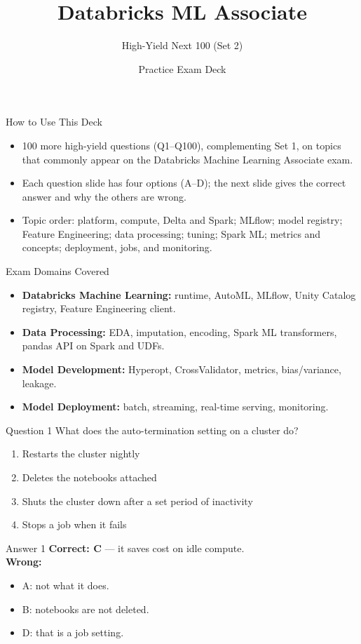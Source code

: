 \documentclass[aspectratio=169,11pt]{beamer}
\title{Databricks ML Associate}
\subtitle{High-Yield Next 100 (Set 2)}
\author{Practice Exam Deck}
\date{}
\begin{document}
\begin{frame}
\titlepage
\end{frame}

\begin{frame}{How to Use This Deck}
\begin{itemize}
\item 100 more high-yield questions (Q1--Q100), complementing Set 1, on topics that commonly appear on the Databricks Machine Learning Associate exam.
\item Each question slide has four options (A--D); the next slide gives the correct answer and why the others are wrong.
\item Topic order: platform, compute, Delta and Spark; MLflow; model registry; Feature Engineering; data processing; tuning; Spark ML; metrics and concepts; deployment, jobs, and monitoring.
\end{itemize}
\end{frame}

\begin{frame}{Exam Domains Covered}
\begin{itemize}
\item \textbf{Databricks Machine Learning:} runtime, AutoML, MLflow, Unity Catalog registry, Feature Engineering client.
\item \textbf{Data Processing:} EDA, imputation, encoding, Spark ML transformers, pandas API on Spark and UDFs.
\item \textbf{Model Development:} Hyperopt, CrossValidator, metrics, bias/variance, leakage.
\item \textbf{Model Deployment:} batch, streaming, real-time serving, monitoring.
\end{itemize}
\end{frame}

\begin{frame}{Question 1}
What does the auto-termination setting on a cluster do?
\begin{enumerate}[label=\Alph*.]
\item Restarts the cluster nightly
\item Deletes the notebooks attached
\item Shuts the cluster down after a set period of inactivity
\item Stops a job when it fails
\end{enumerate}
\end{frame}
\begin{frame}{Answer 1}
\textbf{Correct: C} --- it saves cost on idle compute.\\
\vspace{0.5em}
\textbf{Wrong:}
\begin{itemize}
\item A: not what it does.
\item B: notebooks are not deleted.
\item D: that is a job setting.
\end{itemize}
\end{frame}
\end{document}
